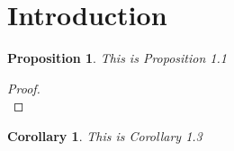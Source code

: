 \documentclass[12pt]{amsart}
\numberwithin{equation}{section}
\numberwithin{figure}{section}
\newtheorem{cor}[equation]{Corollary}
\newtheorem{prop}[equation]{Proposition}
\begin{document}
\section{Introduction}

\begin{prop}
This is Proposition 1.1
\end{prop}
\begin{proof}
\begin{equation}
\end{equation}
\end{proof}

\begin{cor}
This is Corollary 1.3
\end{cor}
\end{document}
